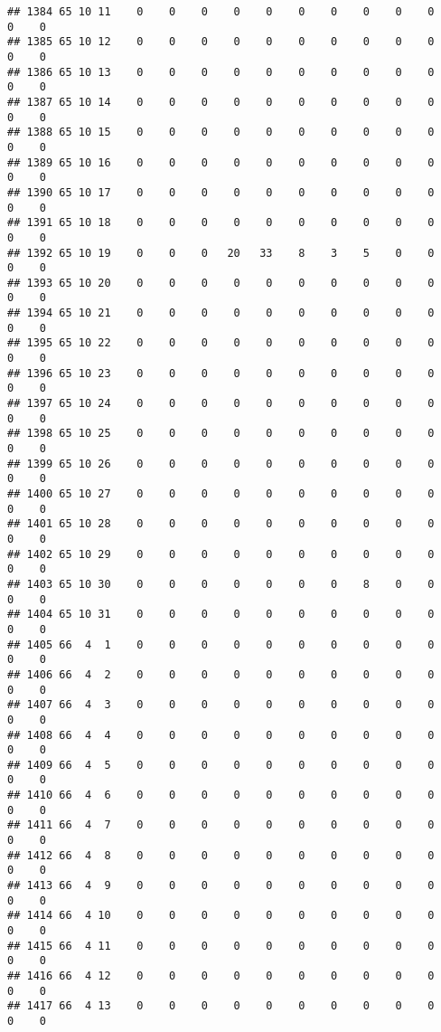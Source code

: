\documentclass[]{article}
\begin{document}
\begin{verbatim}
## 1384 65 10 11    0    0    0    0    0    0    0    0    0    0    0    0
## 1385 65 10 12    0    0    0    0    0    0    0    0    0    0    0    0
## 1386 65 10 13    0    0    0    0    0    0    0    0    0    0    0    0
## 1387 65 10 14    0    0    0    0    0    0    0    0    0    0    0    0
## 1388 65 10 15    0    0    0    0    0    0    0    0    0    0    0    0
## 1389 65 10 16    0    0    0    0    0    0    0    0    0    0    0    0
## 1390 65 10 17    0    0    0    0    0    0    0    0    0    0    0    0
## 1391 65 10 18    0    0    0    0    0    0    0    0    0    0    0    0
## 1392 65 10 19    0    0    0   20   33    8    3    5    0    0    0    0
## 1393 65 10 20    0    0    0    0    0    0    0    0    0    0    0    0
## 1394 65 10 21    0    0    0    0    0    0    0    0    0    0    0    0
## 1395 65 10 22    0    0    0    0    0    0    0    0    0    0    0    0
## 1396 65 10 23    0    0    0    0    0    0    0    0    0    0    0    0
## 1397 65 10 24    0    0    0    0    0    0    0    0    0    0    0    0
## 1398 65 10 25    0    0    0    0    0    0    0    0    0    0    0    0
## 1399 65 10 26    0    0    0    0    0    0    0    0    0    0    0    0
## 1400 65 10 27    0    0    0    0    0    0    0    0    0    0    0    0
## 1401 65 10 28    0    0    0    0    0    0    0    0    0    0    0    0
## 1402 65 10 29    0    0    0    0    0    0    0    0    0    0    0    0
## 1403 65 10 30    0    0    0    0    0    0    0    8    0    0    0    0
## 1404 65 10 31    0    0    0    0    0    0    0    0    0    0    0    0
## 1405 66  4  1    0    0    0    0    0    0    0    0    0    0    0    0
## 1406 66  4  2    0    0    0    0    0    0    0    0    0    0    0    0
## 1407 66  4  3    0    0    0    0    0    0    0    0    0    0    0    0
## 1408 66  4  4    0    0    0    0    0    0    0    0    0    0    0    0
## 1409 66  4  5    0    0    0    0    0    0    0    0    0    0    0    0
## 1410 66  4  6    0    0    0    0    0    0    0    0    0    0    0    0
## 1411 66  4  7    0    0    0    0    0    0    0    0    0    0    0    0
## 1412 66  4  8    0    0    0    0    0    0    0    0    0    0    0    0
## 1413 66  4  9    0    0    0    0    0    0    0    0    0    0    0    0
## 1414 66  4 10    0    0    0    0    0    0    0    0    0    0    0    0
## 1415 66  4 11    0    0    0    0    0    0    0    0    0    0    0    0
## 1416 66  4 12    0    0    0    0    0    0    0    0    0    0    0    0
## 1417 66  4 13    0    0    0    0    0    0    0    0    0    0    0    0

\end{verbatim}
\end{document}

